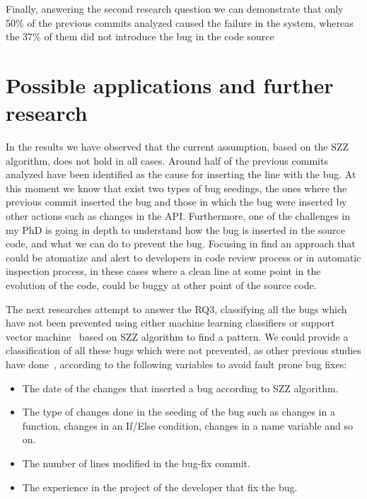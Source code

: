 \documentclass[ifip]{svmult}
\begin{document}
Finally, answering the second research question we can demonstrate that only 50\% of the previous commits analyzed caused the failure in the system, whereas the 37\% of them did not introduce the bug in the code source 

\section{Possible applications and further research}
\label{sec:discussion}

In the results we have observed that the current assumption, based on the SZZ algorithm, does not hold in all cases. Around half of the previous commits analyzed have been identified as the cause for inserting the line with the bug. At this moment we know that exist two types of bug seedings, the ones where the previous commit inserted the bug and those in which the bug were inserted by other actions such as changes in the API. Furthermore, one of the challenges in my PhD is going in depth to understand how the bug is inserted in the source code, and what we can do to prevent the bug. Focusing in find an approach that could be atomatize and alert to developers in code review process or in automatic inspection process, in these cases where a clean line at some point in the evolution of the code, could be buggy at other point of the source code.

The next researches attempt to answer the RQ3, classifying all the bugs which have not been prevented using either machine learning classifiers or support vector machine~\cite{shivaji2009reducing,shivaji2013reducing} based on SZZ algorithm to find a pattern. We could provide a classification of all these bugs which were not prevented, as other previous studies have done~\cite{kim2008classifying,kamei2010revisiting,matsumoto2010analysis,hata2012bug,fujiwara2013assessing}, according to the following variables to avoid fault prone bug fixes:

\begin{itemize}
  \item The date of the changes that inserted a bug according to SZZ algorithm.
  \item The type of changes done in the seeding of the bug such as changes in a function, changes in an If/Else condition, changes in a name variable and so on.
  \item The number of lines modified in the bug-fix commit.
  \item The experience in the project of the developer that fix the bug.
\end{itemize} 
\end{document}
